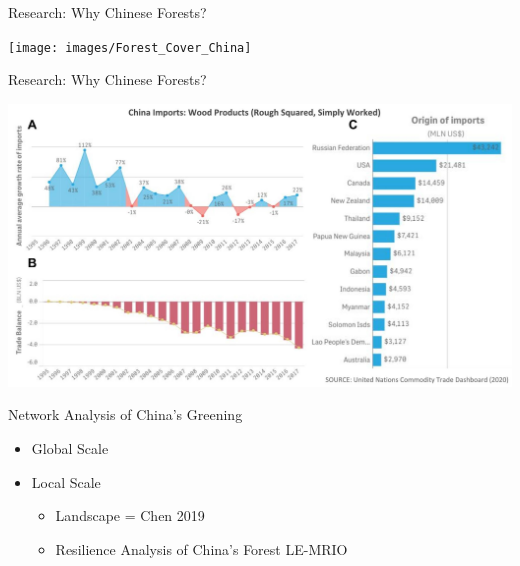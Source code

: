 \documentclass[ignorenonframetext,]{beamer}
\providecommand{\tightlist}{%
  \setlength{\itemsep}{0pt}\setlength{\parskip}{0pt}}
\begin{document}
\begin{frame}{Research: Why Chinese Forests?}
\protect\hypertarget{research-why-chinese-forests-1}{}

\begin{center}\texttt{[image: images/Forest\_Cover\_China]} \end{center}

\end{frame}

\begin{frame}{Research: Why Chinese Forests?}
\protect\hypertarget{research-why-chinese-forests-2}{}

\begin{center}\includegraphics[width=0.5\linewidth]{images/comtrade_china_imports_wood} \end{center}

\end{frame}

\begin{frame}{Network Analysis of China's Greening}
\protect\hypertarget{network-analysis-of-chinas-greening}{}

\begin{itemize}
\tightlist
\item
  Global Scale
\item
  Local Scale

  \begin{itemize}
  \tightlist
  \item
    Landscape = Chen 2019
  \item
    Resilience Analysis of China's Forest LE-MRIO
  \end{itemize}
\end{itemize}

\end{frame}
\end{document}
